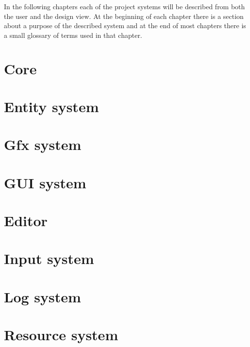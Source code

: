 \documentclass[a4paper, 12pt]{report}
\begin{document}
In the following chapters each of the project systems will be described from both the user and the design view. At the beginning of each chapter there is a section about a purpose of the described system and at the end of most chapters there is a small glossary of terms used in that chapter.

\chapter{Core}



\chapter{Entity system}



\chapter{Gfx system}



\chapter{GUI system}



\chapter{Editor}



\chapter{Input system}



\chapter{Log system}



\chapter{Resource system}


\end{document}
